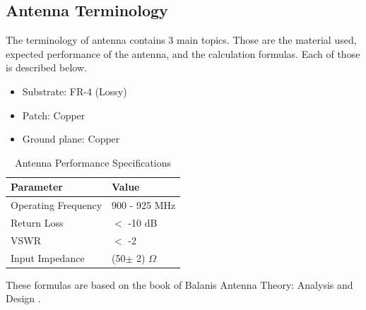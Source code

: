 \documentclass[conference]{IEEEtran}
\begin{document}
\subsection{Antenna Terminology}
The terminology of antenna contains 3 main topics. Those are the material used, expected performance of the antenna, and the calculation formulas. Each of those is described below. 
\begin{itemize}
  \item Substrate: FR-4 (Lossy)
  \item Patch: Copper
  \item Ground plane: Copper
\end{itemize} 

\begin{table}[htbp]
  \begin{center}
  \caption{Antenna Performance Specifications}
  \label{tab:tab1}
  \begin{tabular}{| M{3cm} | M{3cm} |}
    \hline
    \textbf{Parameter} & \textbf{Value} \\
    \hline
    Operating Frequency & 900 - 925 MHz \\
    \hline
    Return Loss & $<$ -10 dB\\ 
    \hline
    VSWR & $<$ -2\\ 
    \hline
    Input Impedance & (50$\pm$ 2) $\Omega$\\
    \hline
  \end{tabular}
  \end{center}
  \end{table}

These formulas are based on the book of Balanis Antenna Theory: Analysis and Design \cite{balanis2015antenna}.
\end{document}
